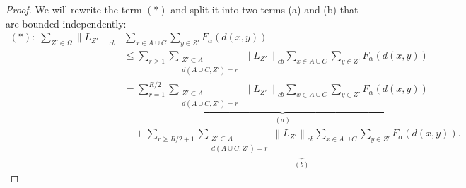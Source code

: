 \documentclass[10pt,a4paper]{amsart}
\newcommand{\La}{\Lambda}
\newcommand{\normm}[2]{\left\lVert#1\right\rVert_{#2}}
\begin{document}
\begin{proof}
    We will rewrite the term $(*)$ and split it into two terms (a) and (b) that are bounded independently:
    \begin{align}
(*):\;\sum_{Z'\in \Omega} \normm{L_{Z'}}{cb}&\sum_{x\in A\cup C}\sum_{y\in Z'}F_\alpha(d(x,y)) \nonumber\\ 
&\le \sum_{r\ge 1}\sum_{\substack{Z'\subset \La \\ d(A\cup C,Z')= r}}\normm{L_{Z'}}{cb}\sum_{x\in A\cup C}\sum_{y\in Z'}F_\alpha(d(x,y)) \label{eq:(*)split} \\
&= \underbrace{\sum_{r=1}^{R/2}\sum_{\substack{Z'\subset \La \\ d(A\cup C,Z')= r}}\normm{L_{Z'}}{cb}\sum_{x\in A\cup C}\sum_{y\in Z'}F_\alpha(d(x,y))}_{(a)} \nonumber\\
&\quad + \underbrace{\sum_{r\ge R/2+1}\sum_{\substack{Z'\subset \La \\ d(A\cup C,Z')= r}}\normm{L_{Z'}}{cb}\sum_{x\in A\cup C}\sum_{y\in Z'}F_\alpha(d(x,y))}_{(b)}. \nonumber
\end{align}
     


\end{proof}
\end{document}
